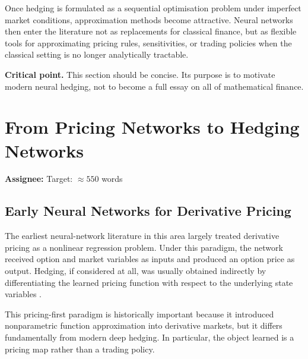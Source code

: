 \documentclass[12pt, a4paper]{article}
\newcommand{\crit}[1]{\noindent\textbf{Critical point.} #1}
\begin{document}
Once hedging is formulated as a sequential optimisation problem under imperfect market
conditions, approximation methods become attractive. Neural networks then enter the
literature not as replacements for classical finance, but as flexible tools for
approximating pricing rules, sensitivities, or trading policies when the classical
setting is no longer analytically tractable.

\crit{This section should be concise. Its purpose is to motivate modern neural
hedging, not to become a full essay on all of mathematical finance.}

\section{From Pricing Networks to Hedging Networks}
\label{sec:pricing_to_hedging}

\begin{assignbox}
\textbf{Assignee:} \underline{\hspace{4cm}} \quad Target: $\approx 550$ words
\end{assignbox}


\subsection{Early Neural Networks for Derivative Pricing}
\label{subsec:early_pricing}

The earliest neural-network literature in this area largely treated derivative pricing
as a nonlinear regression problem. Under this paradigm, the network received option
and market variables as inputs and produced an option price as output. Hedging, if
considered at all, was usually obtained indirectly by differentiating the learned
pricing function with respect to the underlying state variables \citep{HutchinsonLoPoggio1994}.

This pricing-first paradigm is historically important because it introduced
nonparametric function approximation into derivative markets, but it differs
fundamentally from modern deep hedging. In particular, the object learned is a pricing
map rather than a trading policy.

\end{document}
